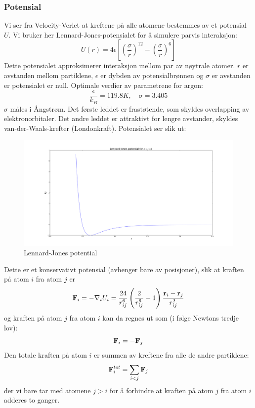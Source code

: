 \documentclass[english, a4paper]{article}
\begin{document}
\subsubsection{Potensial}
Vi ser fra Velocity-Verlet at kreftene på alle atomene bestemmes av et potensial $U$.
Vi bruker her Lennard-Jones-potensialet for å simulere parvis interaksjon:
\begin{equation}
 U(r) = 4\epsilon\left[\left(\frac{\sigma}{r}\right)^{12} - \left(\frac{\sigma}{r}\right)^6 \right]
\end{equation}
Dette potensialet approksimerer interaksjon mellom par av nøytrale atomer. 
$r$ er avstanden mellom partiklene, $\epsilon$ er dybden av potensialbrønnen og $\sigma$ er
avstanden er potensialet er null. Optimale verdier av parametrene for argon:
\begin{equation}
 \frac{\epsilon}{k_B} = 119.8 K, \quad \sigma = 3.405
\end{equation}
$\sigma$ måles i Ångstrøm. Det første leddet er frastøtende, som skyldes overlapping av elektronorbitaler.
Det andre leddet er attraktivt for lengre avstander, skyldes van-der-Waals-krefter (Londonkraft). 
Potensialet ser slik ut:
\begin{figure}[H]
\begin{center}
  \includegraphics[width = 140mm]{lennard-jones.pdf}
  \caption{Lennard-Jones potential}\label{fig:fig1}
  \end{center}
\end{figure}
Dette er et konservativt potensial (avhenger bare av posisjoner), slik at kraften på atom 
$i$ fra atom $j$ er
\begin{equation}
 {\bf F}_i = -\nabla_i U_i = \frac{24}{r_{ij}^6}\left(\frac{2}{r_{ij}^6} - 1\right)
 \frac{{\bf r}_i - {\bf r}_j}{r_{ij}^2}
\end{equation}
og kraften på atom $j$ fra atom $i$ kan da regnes ut som (i følge Newtons tredje lov):
\begin{equation}
 {\bf F}_i = -{\bf F}_j
\end{equation}
Den totale kraften på atom $i$ er summen av kreftene fra alle de andre partiklene:
\begin{equation}
 {\bf F}_i^{tot} = \sum_{i<j} {\bf F}_j
\end{equation}
der vi bare tar med atomene $j>i$ for å forhindre at kraften på atom $j$ fra atom $i$
adderes to ganger.
\end{document}
